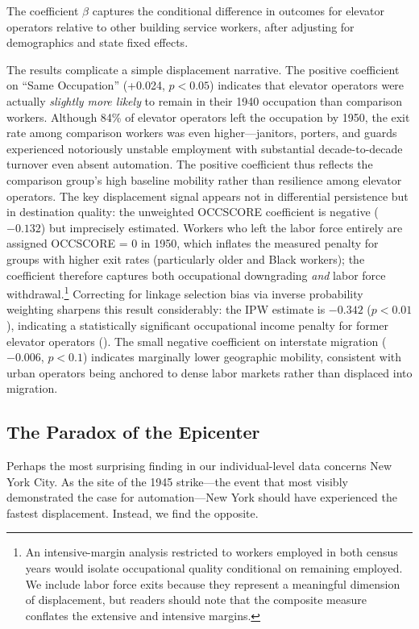 \documentclass[12pt]{article}
\begin{document}
The coefficient $\beta$ captures the conditional difference in outcomes for elevator operators relative to other building service workers, after adjusting for demographics and state fixed effects.

The results complicate a simple displacement narrative. The positive coefficient on ``Same Occupation'' (+0.024, $p < 0.05$) indicates that elevator operators were actually \emph{slightly more likely} to remain in their 1940 occupation than comparison workers. Although 84\% of elevator operators left the occupation by 1950, the exit rate among comparison workers was even higher---janitors, porters, and guards experienced notoriously unstable employment with substantial decade-to-decade turnover even absent automation. The positive coefficient thus reflects the comparison group's high baseline mobility rather than resilience among elevator operators. The key displacement signal appears not in differential persistence but in destination quality: the unweighted OCCSCORE coefficient is negative ($-0.132$) but imprecisely estimated. Workers who left the labor force entirely are assigned OCCSCORE = 0 in 1950, which inflates the measured penalty for groups with higher exit rates (particularly older and Black workers); the coefficient therefore captures both occupational downgrading \emph{and} labor force withdrawal.\footnote{An intensive-margin analysis restricted to workers employed in both census years would isolate occupational quality conditional on remaining employed. We include labor force exits because they represent a meaningful dimension of displacement, but readers should note that the composite measure conflates the extensive and intensive margins.} Correcting for linkage selection bias via inverse probability weighting sharpens this result considerably: the IPW estimate is $-0.342$ ($p < 0.01$), indicating a statistically significant occupational income penalty for former elevator operators (). The small negative coefficient on interstate migration ($-0.006$, $p < 0.1$) indicates marginally lower geographic mobility, consistent with urban operators being anchored to dense labor markets rather than displaced into migration.

\subsection{The Paradox of the Epicenter}

Perhaps the most surprising finding in our individual-level data concerns New York City. As the site of the 1945 strike---the event that most visibly demonstrated the case for automation---New York should have experienced the fastest displacement. Instead, we find the opposite.
\end{document}
